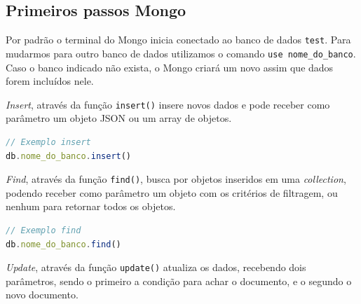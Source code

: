 \documentclass[
	12pt,				%
	openright,			%
	twoside,			%
	a4paper,			%
	english,			%
	brazil				%
	]{abntex2}
\begin{document}
% 


%
%



\begin{anexosenv}

\partanexos

\chapter{Primeiros passos Mongo}

Por padrão o terminal do Mongo inicia conectado ao banco de dados \verb|test|. Para mudarmos para outro banco de dados utilizamos o comando \verb|use nome_do_banco|. Caso o banco indicado não exista, o Mongo criará um novo assim que dados forem incluídos nele.

\textit{Insert}, através da função \verb|insert()| insere novos dados e pode receber como parâmetro um objeto JSON ou um array de objetos.

\begin{lstlisting}[language=javascript]
// Exemplo insert
db.nome_do_banco.insert()
\end{lstlisting}

\textit{Find}, através da função \verb|find()|, busca por objetos inseridos em uma \textit{collection}, podendo receber como parâmetro um objeto com os critérios de filtragem, ou nenhum para retornar todos os objetos.
 
\begin{lstlisting}[language=javascript]
// Exemplo find
db.nome_do_banco.find()
\end{lstlisting}

\textit{Update}, através da função \verb|update()| atualiza os dados, recebendo dois parâmetros, sendo o primeiro a condição para achar o documento, e o segundo o novo documento.


\end{anexosenv}
\end{document}

